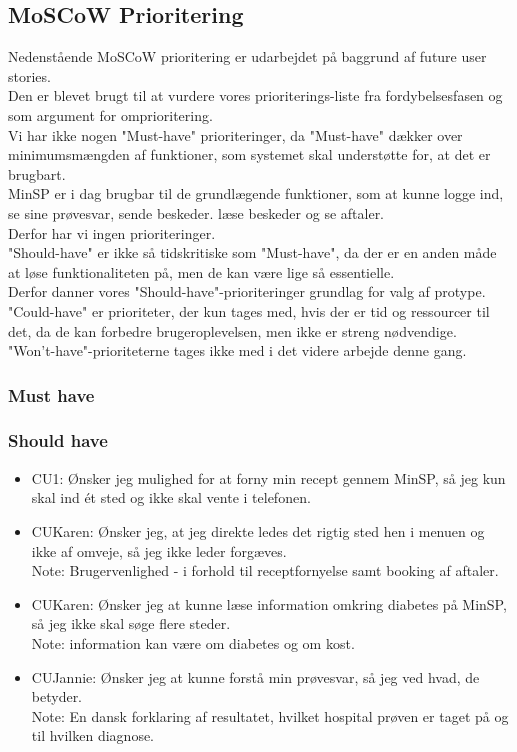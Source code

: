 \subsection{MoSCoW Prioritering}
Nedenstående MoSCoW prioritering er udarbejdet på baggrund af future user stories.\\
Den er blevet brugt til at vurdere vores prioriterings-liste fra fordybelsesfasen og som argument for omprioritering.\\
Vi har ikke nogen "Must-have" prioriteringer, da "Must-have" dækker over minimumsmængden af funktioner, som systemet skal understøtte for, at det er brugbart.\\
MinSP er i dag brugbar til de grundlægende funktioner, som at kunne logge ind, se sine prøvesvar, sende beskeder. læse beskeder og se aftaler. \\
Derfor har vi ingen prioriteringer.\\
"Should-have" er ikke så tidskritiske som "Must-have", da der er en anden måde at løse funktionaliteten på, men de kan være lige så essentielle.\\
Derfor danner vores "Should-have"-prioriteringer grundlag for valg af protype.\\
"Could-have" er prioriteter, der kun tages med, hvis der er tid og ressourcer til det, da de kan forbedre brugeroplevelsen, men ikke er streng nødvendige. \\
"Won't-have"-prioriteterne tages ikke med i det videre arbejde denne gang.
\subsubsection*{Must have}
\subsubsection*{Should have}
\begin{itemize}
\item CU1: Ønsker jeg mulighed for at forny min recept gennem MinSP, så jeg kun skal ind ét sted og ikke skal vente i telefonen.
\item CUKaren: Ønsker jeg, at jeg direkte ledes det rigtig sted hen i menuen og ikke af omveje, så jeg ikke leder forgæves. \\
Note: Brugervenlighed - i forhold til receptfornyelse samt booking af aftaler.
\item CUKaren: Ønsker jeg at kunne læse information omkring diabetes på MinSP, så jeg ikke skal søge flere steder. \\
Note: information kan være om diabetes og om kost.
\item CUJannie: Ønsker jeg at kunne forstå min prøvesvar, så jeg ved hvad, de betyder. \\
Note: En dansk forklaring af resultatet, hvilket hospital prøven er taget på og til hvilken diagnose.
\end{itemize}
